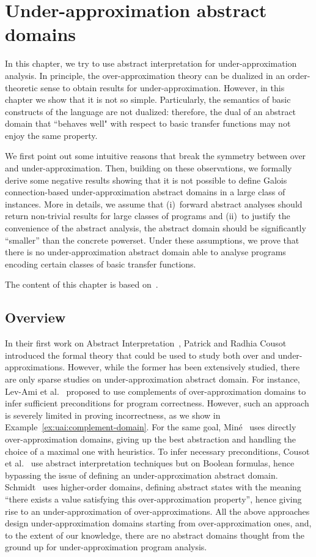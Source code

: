 
\chapter{Under-approximation abstract domains}\label{ch:uai}
In this chapter, we try to use abstract interpretation for under-approximation analysis. In principle, the over-approximation theory can be dualized in an order-theoretic sense to obtain results for under-approximation. However, in this chapter we show that it is not so simple. Particularly, the semantics of basic constructs of the language are not dualized: therefore, the dual of an abstract domain that ``behaves well" with respect to basic transfer functions may not enjoy the same property.

We first point out some intuitive reasons that break the symmetry between over and under-approximation. Then, building on these observations, we formally derive some negative results showing that it is not possible to define Galois connection-based under-approximation abstract domains in a large class of instances. More in details, we assume that (i)~forward abstract analyses should return non-trivial results for large classes of programs and (ii)~to justify the convenience of the abstract analysis, the abstract domain should be significantly “smaller” than the concrete powerset. Under these assumptions, we prove that there is no under-approximation abstract domain able to analyse programs encoding certain classes of basic transfer functions.

The content of this chapter is based on~\cite{ABG22,ABG24}.

\section{Overview}
In their first work on Abstract Interpretation~\cite{CC77}, Patrick and Radhia Cousot introduced the formal theory that could be used to study both over and under-approximations.
However, while the former has been extensively studied, there are only sparse studies on under-approximation abstract domain.
For instance, Lev-Ami et al.~\cite{LSRG07} proposed to use complements of over-approximation domains to infer sufficient preconditions for program correctness. However, such an approach is severely limited in proving incorrectness, as we show in Example~\ref{ex:uai:complement-domain}.
For the same goal, Miné~\cite{Mine14} uses directly over-approximation domains, giving up the best abstraction and handling the choice of a maximal one with heuristics.
To infer necessary preconditions, Cousot et al.~\cite{CCL11,CCFL13} use abstract interpretation techniques but on Boolean formulas, hence bypassing the issue of defining an under-approximation abstract domain.
Schmidt~\cite{Schmidt07} uses higher-order domains, defining abstract states with the meaning ``there exists a value satisfying this over-approximation property'', hence giving rise to an under-approximation of over-approximations.
All the above approaches design under-approximation domains starting from over-approximation ones, and, to the extent of our knowledge, there are no abstract domains thought from the ground up for under-approximation program analysis.

